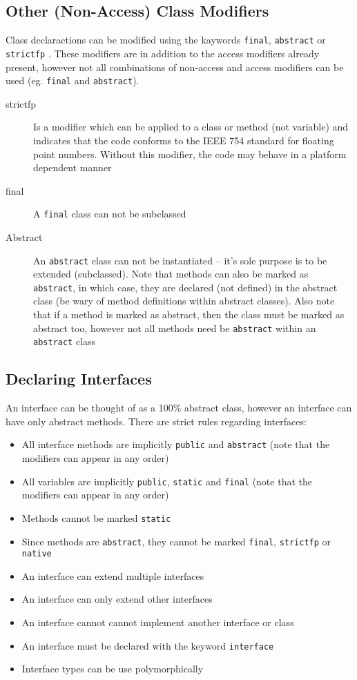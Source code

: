 \subsection{Other (Non-Access) Class Modifiers}
Class declaractions can be modified using the kaywords \verb#final#, 
\verb#abstract# or \verb#strictfp# . These modifiers are in addition to the 
access modifiers already present, however not all combinations of non-access 
and access modifiers can be used (eg. \verb#final# and \verb#abstract#).
\begin{description}
    \item[strictfp] Is a modifier which can be applied to a class or method 
    (not variable) and indicates that the code conforms to the IEEE 754 
    standard for floating point numbers. Without this modifier, the code may 
    behave in a platform dependent manner
    \item[final] A \verb#final# class can not be subclassed
    \item[Abstract] An \verb#abstract# class can not be instantiated -- it's 
    sole purpose is to be extended (subclassed). Note that methods can also be 
    marked as \verb#abstract#, in which case, they are declared (not defined) 
    in the abstract class (be wary of method definitions within abstract 
    classes). Also note that if a method is marked as abstract, then the class 
    must be marked as abstract too, however not all methods need be 
    \verb#abstract# within an \verb#abstract# class
\end{description}

\subsection{Declaring Interfaces}
An interface can be thought of as a 100\% abstract class, however an interface 
can have only abstract methods. There are strict rules regarding interfaces:
\begin{itemize}
    \item All interface methods are implicitly \verb#public# and 
    \verb#abstract# (note that the modifiers can appear in any order)
    \item All variables are implicitly \verb#public#, \verb#static# and 
    \verb#final# (note that the modifiers can appear in any order)
    \item Methods cannot be marked \verb#static#
    \item Since methods are \verb#abstract#, they cannot be marked 
    \verb#final#, \verb#strictfp# or \verb#native#
    \item An interface can extend multiple interfaces
    \item An interface can only extend other interfaces
    \item An interface cannot cannot implement another interface or class
    \item An interface must be declared with the keyword \verb#interface#
    \item Interface types can be use polymorphically
\end{itemize}

